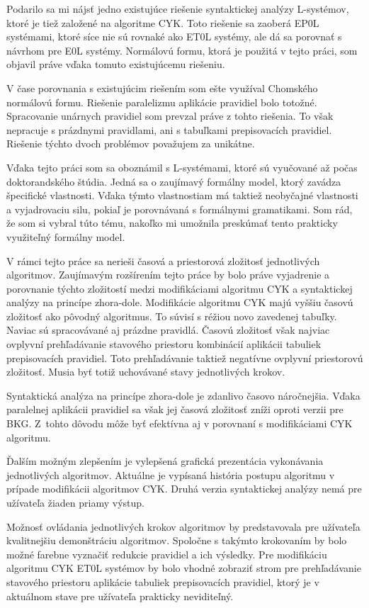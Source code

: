Podarilo sa mi nájsť jedno existujúce riešenie syntaktickej analýzy L-systémov, ktoré je tiež založené na algoritme CYK. Toto riešenie sa zaoberá EP0L systémami, ktoré síce nie sú rovnaké ako ET0L systémy, ale dá sa porovnať s návrhom pre E0L systémy. Normálovú formu, ktorá je použitá v tejto práci, som objavil práve vďaka tomuto existujúcemu riešeniu.

V čase porovnania s existujúcim riešením som ešte využíval Chomského normálovú formu. Riešenie paralelizmu aplikácie pravidiel bolo totožné. Spracovanie unárnych pravidiel som prevzal práve z tohto riešenia. To však nepracuje s prázdnymi pravidlami, ani s tabuľkami prepisovacích pravidiel. Riešenie týchto dvoch problémov považujem za unikátne.

Vďaka tejto práci som sa oboznámil s L-systémami, ktoré sú vyučované až počas doktorandského štúdia. Jedná sa o zaujímavý formálny model, ktorý zavádza špecifické vlastnosti. Vďaka týmto vlastnostiam má taktiež neobyčajné vlastnosti a vyjadrovaciu silu, pokiaľ je porovnávaná s formálnymi gramatikami. Som rád, že som si vybral túto tému, nakoľko mi umožnila preskúmať tento prakticky využiteľný formálny model.


V rámci tejto práce sa nerieši časová a priestorová zložitosť jednotlivých algoritmov.
Zaujímavým rozšírením tejto práce by bolo práve vyjadrenie a porovnanie týchto zložitostí medzi modifikáciami algoritmu CYK a syntaktickej analýzy na princípe zhora-dole. Modifikácie algoritmu CYK majú vyššiu časovú zložitosť ako pôvodný algoritmus. To súvisí s réžiou novo zavedenej tabuľky. Naviac sú spracovávané aj prázdne pravidlá. Časovú zložitosť však najviac ovplyvní prehľadávanie stavového priestoru kombinácií aplikácii tabuliek prepisovacích pravidiel. Toto prehľadávanie taktiež negatívne ovplyvní priestorovú zložitosť. Musia byť totiž uchovávané stavy jednotlivých krokov.

Syntaktická analýza na princípe zhora-dole je zdanlivo časovo náročnejšia. Vďaka paralelnej aplikácii pravidiel sa však jej časová zložitosť zníži oproti verzii pre BKG. Z~tohto dôvodu môže byť efektívna aj v porovnaní s modifikáciami CYK algoritmu.


Ďalším možným zlepšením je vylepšená grafická prezentácia vykonávania jednotlivých algoritmov. Aktuálne je vypísaná história postupu algoritmu v prípade modifikácii algoritmov CYK. Druhá verzia syntaktickej analýzy nemá pre užívateľa žiaden priamy výstup.

Možnosť ovládania jednotlivých krokov algoritmov by predstavovala pre užívateľa kvalitnejšiu demonštráciu algoritmov. Spoločne s takýmto krokovaním by bolo možné farebne vyznačiť redukcie pravidiel a ich výsledky. Pre modifikáciu algoritmu CYK ET0L systémov by bolo vhodné zobraziť strom pre prehľadávanie stavového priestoru aplikácie tabuliek prepisovacích pravidiel, ktorý je v aktuálnom stave pre užívateľa prakticky neviditeľný.

